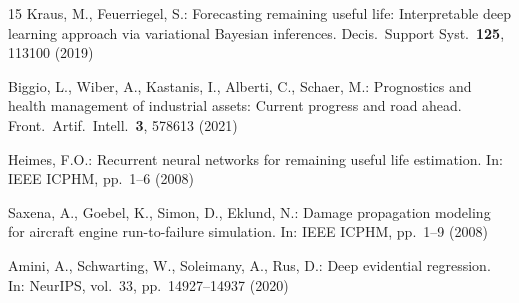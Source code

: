 \documentclass[runningheads]{llncs}
\begin{document}
\begin{thebibliography}{15}
Kraus, M., Feuerriegel, S.:
Forecasting remaining useful life: Interpretable deep learning approach via variational Bayesian inferences.
Decis.\ Support Syst.\ \textbf{125}, 113100 (2019)

Biggio, L., Wiber, A., Kastanis, I., Alberti, C., Schaer, M.:
Prognostics and health management of industrial assets: Current progress and road ahead.
Front.\ Artif.\ Intell.\ \textbf{3}, 578613 (2021)

Heimes, F.O.:
Recurrent neural networks for remaining useful life estimation.
In: IEEE ICPHM, pp.~1--6 (2008)

Saxena, A., Goebel, K., Simon, D., Eklund, N.:
Damage propagation modeling for aircraft engine run-to-failure simulation.
In: IEEE ICPHM, pp.~1--9 (2008)

Amini, A., Schwarting, W., Soleimany, A., Rus, D.:
Deep evidential regression.
In: NeurIPS, vol.~33, pp.~14927--14937 (2020)

\end{thebibliography}
\end{document}
